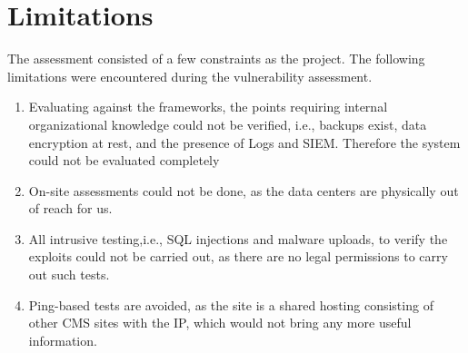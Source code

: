 \chapter{Limitations}
The assessment consisted of a few constraints as the project.  The following limitations were encountered during the vulnerability assessment.
\begin{enumerate}
    \item Evaluating against the frameworks, the points requiring internal organizational knowledge could not be verified, i.e., backups exist, data encryption at rest, and the presence of Logs and SIEM. Therefore the system could not be evaluated completely 
    \item On-site assessments could not be done, as the data centers are physically out of reach for us.
    \item All intrusive testing,i.e., SQL injections and malware uploads, to verify the exploits could not be carried out, as there are no legal permissions to carry out such tests.
    \item Ping-based tests are avoided, as the site is a shared hosting consisting of other CMS sites with the IP, which would not bring any more useful information.
\end{enumerate}